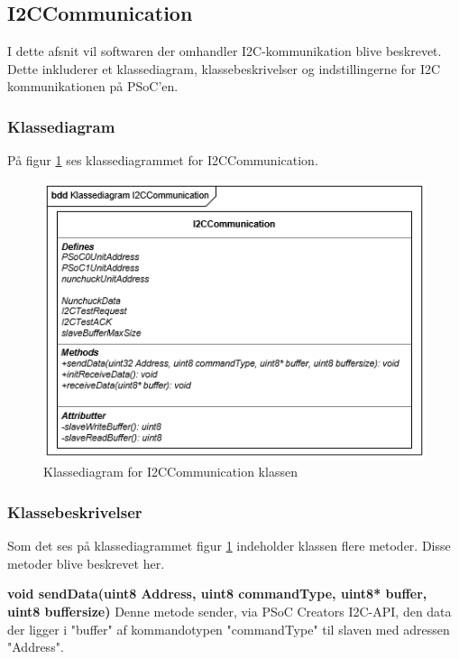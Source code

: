 \subsection{I2CCommunication}
I dette afsnit vil softwaren der omhandler I2C-kommunikation blive beskrevet. Dette inkluderer et klassediagram,  klassebeskrivelser og indstillingerne for I2C kommunikationen på PSoC'en.

\subsubsection{Klassediagram}
På figur \ref{figure:klassediagramI2CCommunication} ses klassediagrammet for I2CCommunication. 
\begin{figure}[H]
	\centering
	\includegraphics[]{DesignOgImplementering/images/I2CCommunication}
	\caption{Klassediagram for I2CCommunication klassen}
	\label{figure:klassediagramI2CCommunication}
\end{figure}

\subsubsection{Klassebeskrivelser}
Som det ses på klassediagrammet figur \ref{figure:klassediagramI2CCommunication} indeholder klassen flere metoder. Disse metoder blive beskrevet her.\newline

\noindent\textbf{void sendData(uint8 Address, uint8 commandType, uint8* buffer, uint8 buffersize)}\newline
Denne metode sender, via PSoC Creators I2C-API, den data der ligger i "buffer" af kommandotypen "commandType" til slaven med adressen "Address". \newline

